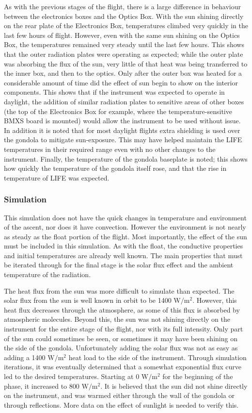 As with the previous stages of the flight, there is a large difference in behaviour between the electronics boxes and the Optics Box. With the sun shining directly on the rear plate of the Electronics Box, temperatures climbed very quickly in the last few hours of flight. However, even with the same sun shining on the Optics Box, the temperatures remained very steady until the last few hours. This shows that the outer radiation plates were operating as expected; while the outer plate was absorbing the flux of the sun, very little of that heat was being transferred to the inner box, and then to the optics. Only after the outer box was heated for a considerable amount of time did the effect of sun begin to show on the interior components. This shows that if the instrument was expected to operate in daylight, the addition of similar radiation plates to sensitive areas of other boxes (the top of the Electronics Box for example, where the temperature-sensitive BMXS board is mounted) would allow the instrument to be used without issue. In addition it is noted that for most daylight flights extra shielding is used over the gondola to mitigate sun-exposure. This may have helped maintain the LIFE temperatures in their required range even with no other changes to the instrument. Finally, the temperature of the gondola baseplate is noted; this shows how quickly the temperature of the gondola itself rose, and that the rise in temperature of LIFE was expected.

\subsubsection{Simulation}
This simulation does not have the quick changes in temperature and environment of the ascent, nor does it have convection. However the environment is not nearly as steady as the float portion of the flight. Most importantly, the effect of the sun must be included in this simulation. As with the float, the conductive properties and initial temperatures are already well known. The main properties that must be iterated through for the final stage is the solar flux effect and the ambient temperature of the radiation.

The heat flux from the sun was more difficult to simulate than expected. The solar flux from the sun is well known in orbit to be 1400 $\mathrm{W/m^2}$. However, this heat flux decreases through the atmosphere, as some of this flux is absorbed by atmospheric molecules. Beyond this, the sun was not shining directly on the instrument for the entire stage of the flight, nor with its full intensity. Only part of the sun could sometimes be seen, or sometimes it may have been shining on the side of the gondola. Unfortunately adding the solar flux was not as easy as adding a 1400 $\mathrm{W/m^2}$ heat load to the side of the instrument. Through simulation iterations, it was eventually determined that a somewhat exponential flux curve led to the desired temperatures. Starting at 0 $\mathrm{W/m^2}$ for the beginning of the phase, it increased to 800 $\mathrm{W/m^2}$. It is believed that the sun did not shine directly on the instrument, and was warmed either through the wall of the gondola or through reflections. More data on the effect of sunlight is needed to verify this.

